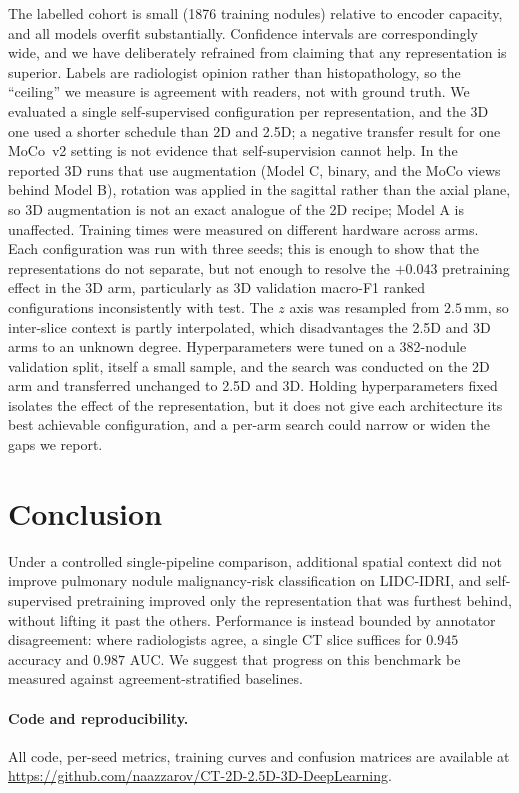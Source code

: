 \documentclass[11pt]{article}
\begin{document}
The labelled cohort is small (1876 training nodules) relative to encoder
capacity, and all models overfit substantially. Confidence intervals are
correspondingly wide, and we have deliberately refrained from claiming that any
representation is superior. Labels are radiologist opinion rather than
histopathology, so the ``ceiling'' we measure is agreement with readers, not
with ground truth. We evaluated a single self-supervised configuration per
representation, and the 3D one used a shorter schedule than 2D and 2.5D; a
negative transfer result for one MoCo~v2 setting is not evidence that
self-supervision cannot help. In the reported 3D runs that use augmentation
(Model C, binary, and the MoCo views behind Model B), rotation was applied in
the sagittal rather than the axial plane, so 3D augmentation is not an exact
analogue of the 2D recipe; Model A is unaffected. Training times were measured
on different hardware across arms. Each configuration was run with three seeds;
this is enough to show that the representations do not separate, but not enough
to resolve the $+0.043$ pretraining effect in the 3D arm, particularly as 3D
validation macro-F1 ranked configurations inconsistently with test. The $z$ axis
was resampled from $2.5\,\mathrm{mm}$, so inter-slice context is partly
interpolated, which disadvantages the 2.5D and 3D arms to an unknown degree.
Hyperparameters were tuned on a 382-nodule validation split, itself a small
sample, and the search was conducted on the 2D arm and transferred unchanged to
2.5D and 3D. Holding hyperparameters fixed isolates the effect of the
representation, but it does not give each architecture its best achievable
configuration, and a per-arm search could narrow or widen the gaps we report.

\section{Conclusion}

Under a controlled single-pipeline comparison, additional spatial context did
not improve pulmonary nodule malignancy-risk classification on LIDC-IDRI, and
self-supervised pretraining improved only the representation that was furthest
behind, without lifting it past the others. Performance is instead bounded by
annotator disagreement: where radiologists agree, a single CT slice suffices for
$0.945$ accuracy and $0.987$ AUC. We suggest that progress on this benchmark be
measured against agreement-stratified baselines.

\paragraph{Code and reproducibility.} All code, per-seed metrics, training
curves and confusion matrices are available at
\url{https://github.com/naazzarov/CT-2D-2.5D-3D-DeepLearning}.



\end{document}
